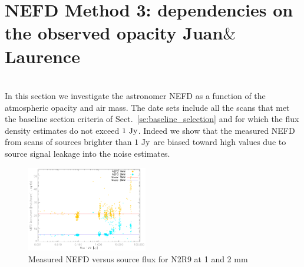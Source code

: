 
\section{NEFD Method 3: dependencies on the observed opacity {\color{blue} Juan$\&$Laurence}}
\label{NEFD_pipeline}


\\

In this section we investigate the astronomer NEFD as a function of
the atmospheric opacity and air mass.            
The date sets include all the scans that met the baseline section
criteria of Sect.~\ref{se:baseline_selection} and for which the flux
density estimates do not exceed $1~\rm{Jy}$. Indeed we show that the
measured NEFD from scans of sources brighter than $1~\rm{Jy}$ are
biased toward high values due to source signal leakage into the noise
estimates.

\begin{figure}
\begin{center}
 \includegraphics[clip=true,width=0.47\textwidth]{Figures/NEFDIndScans/nefd_flux1mm_run22.pdf}
 \caption[Measured NEFD versus source flux for N2R9 at 1 and 2 mm]{Measured NEFD versus source flux for N2R9 at 1 and 2 mm}
\label{fig:nefdvsbackground}
\end{center}
\end{figure}


